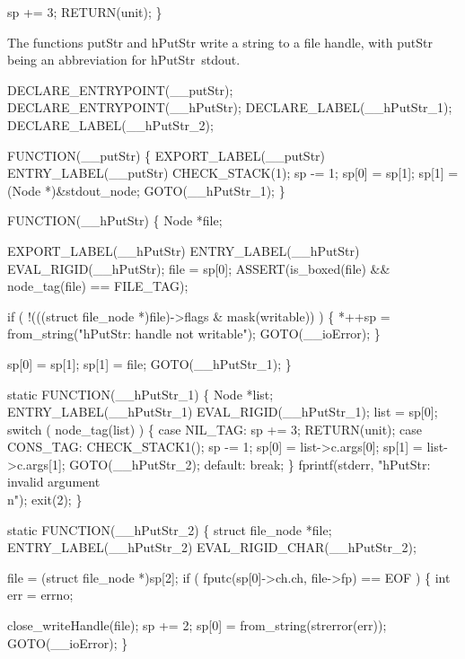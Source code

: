     sp += 3;
    RETURN(unit);
\}

\nwendcode{}\nwdocspar
The functions {\Tt{}putStr\nwendquote} and {\Tt{}hPutStr\nwendquote} write a string to a file
handle, with {\Tt{}putStr\nwendquote} being an abbreviation for {\Tt{}hPutStr\ stdout\nwendquote}.

\nwenddocs{}\plusendmoddef\nwstartdeflinemarkup{}\nwenddeflinemarkup
DECLARE_ENTRYPOINT(__putStr);
DECLARE_ENTRYPOINT(__hPutStr);
DECLARE_LABEL(__hPutStr_1);
DECLARE_LABEL(__hPutStr_2);

FUNCTION(__putStr)
\{
    EXPORT_LABEL(__putStr)
 ENTRY_LABEL(__putStr)
    CHECK_STACK(1);
    sp   -= 1;
    sp[0] = sp[1];
    sp[1] = (Node *)&stdout_node;
    GOTO(__hPutStr_1);
\}

FUNCTION(__hPutStr)
\{
    Node *file;

    EXPORT_LABEL(__hPutStr)
 ENTRY_LABEL(__hPutStr)
    EVAL_RIGID(__hPutStr);
    file = sp[0];
    ASSERT(is_boxed(file) && node_tag(file) == FILE_TAG);

    if ( !(((struct file_node *)file)->flags & mask(writable)) )
    \{
        *++sp = from_string("hPutStr: handle not writable");
        GOTO(__ioError);
    \}

    sp[0] = sp[1];
    sp[1] = file;
    GOTO(__hPutStr_1);
\}

static
FUNCTION(__hPutStr_1)
\{
    Node *list;
 ENTRY_LABEL(__hPutStr_1)
    EVAL_RIGID(__hPutStr_1);
    list = sp[0];
    switch ( node_tag(list) )
    \{
    case NIL_TAG:
        sp += 3;
        RETURN(unit);
    case CONS_TAG:
        CHECK_STACK1();
        sp   -= 1;
        sp[0] = list->c.args[0];
        sp[1] = list->c.args[1];
        GOTO(__hPutStr_2);
    default:
        break;
    \}
    fprintf(stderr, "hPutStr: invalid argument\\n");
    exit(2);
\}

static
FUNCTION(__hPutStr_2)
\{
    struct file_node *file;
 ENTRY_LABEL(__hPutStr_2)
    EVAL_RIGID_CHAR(__hPutStr_2);

    file = (struct file_node *)sp[2];
    if ( fputc(sp[0]->ch.ch, file->fp) == EOF )
    \{
        int err = errno;

        close_writeHandle(file);
        sp   += 2;
        sp[0] = from_string(strerror(err));
        GOTO(__ioError);
    \}

